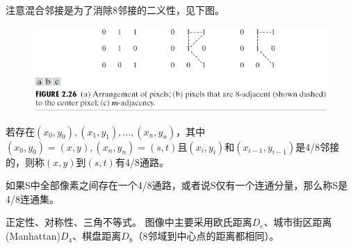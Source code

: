 注意混合邻接是为了消除8邻接的二义性，见下图。
\begin{figure}[H]
\centering
\includegraphics[width=0.6\linewidth]{fig/adjacency.png}
\end{figure}

\begin{definition}[通路]
若存在$(x_0,y_0),(x_1,y_1),\ldots,(x_n,y_n)$，其中$(x_0,y_0)=(x,y),(x_n,y_n)=(s,t)$且$(x_i,y_i)$和$(x_{i-1},y_{i-1})$是4/8邻接的，则称$(x,y)$到$(s,t)$有4/8通路。
\end{definition}

\begin{definition}[连通集]
如果S中全部像素之间存在一个4/8通路，或者说S仅有一个连通分量，那么称S是4/8连通集。 
\end{definition}

\begin{definition}[距离度量]
正定性、对称性、三角不等式。
图像中主要采用欧氏距离$D_e$、城市街区距离(Manhattan)$D_4$、棋盘距离$D_8$（8邻域到中心点的距离都相同）。
\end{definition}